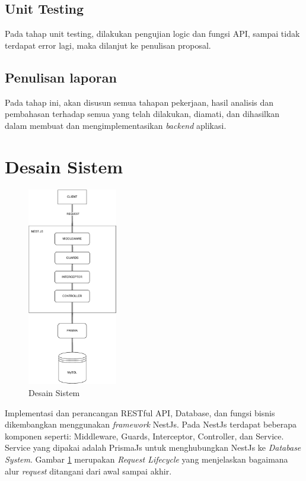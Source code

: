 \subsection{Unit Testing}
Pada tahap unit testing, dilakukan pengujian logic dan fungsi API, sampai tidak terdapat error lagi, maka dilanjut ke penulisan proposal.

\subsection{Penulisan laporan}
Pada tahap ini, akan disusun semua tahapan pekerjaan, hasil analisis dan pembahasan terhadap semua yang telah dilakukan, diamati, dan dihasilkan dalam membuat dan mengimplementasikan \textit{backend} aplikasi.

\section{Desain Sistem}
\begin{figure}[h]
	\centering
	\includegraphics[width=0.35\textwidth]{drawio/sistem-desain.drawio.pdf}
	\caption{Desain Sistem}
	\label{sistem-desain}
\end{figure}
Implementasi dan perancangan RESTful API, Database, dan fungsi bisnis dikembangkan menggunakan \textit{framework} NestJs. Pada NestJs terdapat beberapa komponen seperti: Middleware, Guards, Interceptor, Controller, dan Service. Service yang dipakai adalah PrismaJs untuk menghubungkan NestJs ke \textit{Database System}. Gambar \ref{sistem-desain} merupakan \textit{Request Lifecycle} yang menjelaskan bagaimana alur \textit{request} ditangani dari awal sampai akhir.

